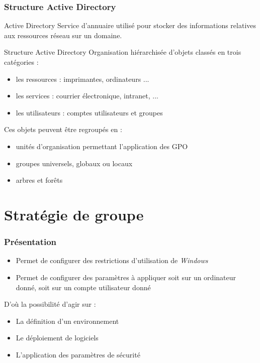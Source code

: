 \documentclass{beamer}
\begin{document}
  \begin{frame}
    \frametitle{Structure Active Directory}
    \begin{block}{Active Directory}
      Service d'annuaire utilisé pour stocker des informations relatives aux ressources réseau sur un domaine.
    \end{block}    
    \begin{block}{Structure Active Directory}
      Organisation hiérarchisée d'objets classés en trois catégories :
      \begin{itemize}
       \item les ressources : imprimantes, ordinateurs ...
       \item les services : courrier électronique, intranet, ...
       \item les utilisateurs : comptes utilisateurs et groupes
      \end{itemize}
      Ces objets peuvent être regroupés en :
      \begin{itemize}
       \item unités d'organisation permettant l'application des GPO
       \item groupes universels, globaux ou locaux
       \item arbres et forêts
      \end{itemize}
    \end{block}
  \end{frame}

  \section{Stratégie de groupe}
  \begin{frame}
    \frametitle{Présentation}
    \begin{itemize}
     \item Permet de configurer des restrictions d'utilisation de \textit{Windows} 
     \item Permet de configurer des paramètres à appliquer soit sur un ordinateur donné, soit sur un compte utilisateur donné
    \end{itemize}
    D'où la possibilité d'agir sur :
    \begin{itemize}
     \item La définition d'un environnement
     \item Le déploiement de logiciels
     \item L'application des paramètres de sécurité
    \end{itemize}
  \end{frame}
  
\end{document}
